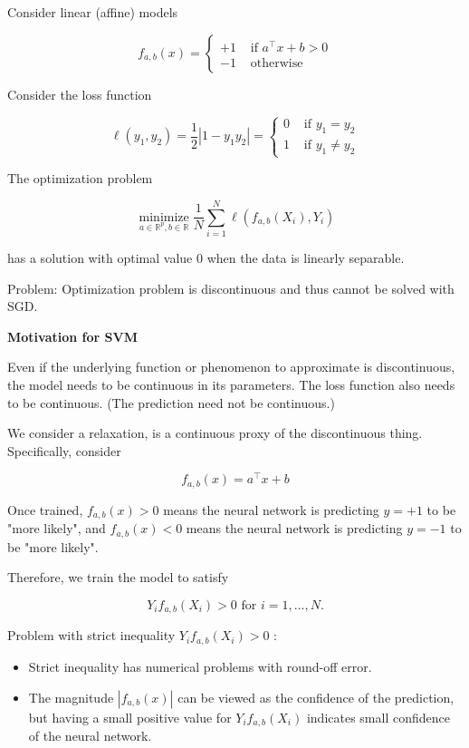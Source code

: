\documentclass{beamer}
\begin{document}
\begin{frame}[allowframebreaks]

Consider linear (affine) models

$$
f_{a, b}(x)= \begin{cases}+1 & \text { if } a^{\top} x+b>0 \\ -1 & \text { otherwise }\end{cases}
$$

Consider the loss function

$$
\ell\left(y_{1}, y_{2}\right)=\frac{1}{2}\left|1-y_{1} y_{2}\right|= \begin{cases}0 & \text { if } y_{1}=y_{2} \\ 1 & \text { if } y_{1} \neq y_{2}\end{cases}
$$

The optimization problem

$$
\underset{a \in \mathbb{R}^{p}, b \in \mathbb{R}}{\operatorname{minimize}} \frac{1}{N} \sum_{i=1}^{N} \ell\left(f_{a, b}\left(X_{i}\right), Y_{i}\right)
$$

has a solution with optimal value 0 when the data is linearly separable.

Problem: Optimization problem is discontinuous and thus cannot be solved with SGD.

\par\noindent\textcolor{gray}{\hdashrule{\textwidth}{0.4pt}{1pt 2pt}}

\textbf{Motivation for SVM}

Even if the underlying function or phenomenon to approximate is discontinuous, the model needs to be continuous in its parameters. The loss function also needs to be continuous. (The prediction need not be continuous.)

We consider a relaxation, is a continuous proxy of the discontinuous thing. Specifically, consider

$$
f_{a, b}(x)=a^{\top} x+b
$$

Once trained, $f_{a, b}(x)>0$ means the neural network is predicting $y=+1$ to be "more likely", and $f_{a, b}(x)<0$ means the neural network is predicting $y=-1$ to be "more likely".

Therefore, we train the model to satisfy

$$
Y_{i} f_{a, b}\left(X_{i}\right)>0 \text { for } i=1, \ldots, N .
$$

Problem with strict inequality $Y_{i} f_{a, b}\left(X_{i}\right)>0$ :

\begin{itemize}
    \item Strict inequality has numerical problems with round-off error.
    \item The magnitude $\left|f_{a, b}(x)\right|$ can be viewed as the confidence of the prediction, but having a small positive value for $Y_{i} f_{a, b}\left(X_{i}\right)$ indicates small confidence of the neural network.
\end{itemize}


\end{frame}
\end{document}
